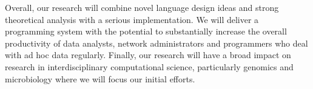 \documentclass[11pt]{article}
\begin{document}

Overall, our research will combine novel language design ideas and
strong theoretical analysis with a serious implementation.  We will
deliver a programming system with the potential to substantially
increase the overall productivity of data analysts, network administrators
and programmers who
deal with ad hoc data regularly.  Finally, our research will have a
broad impact on research in interdisciplinary computational science,
particularly genomics and microbiology where we will focus
our initial efforts.
\end{document}
